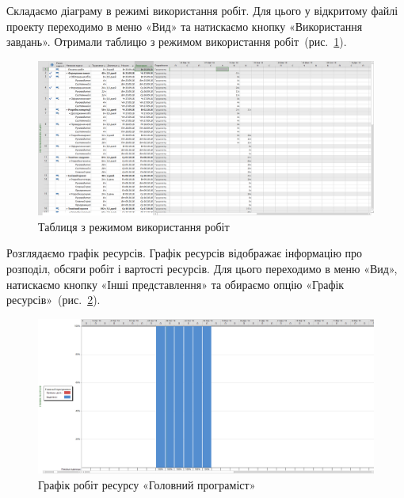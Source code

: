 \documentclass[
	a4paper,
	oneside,
	BCOR = 10mm,
	DIV = 12,
	12pt,
	headings = normal,
]{scrartcl}
\begin{document}
		Складаємо діаграму в режимі використання робіт. Для цього у відкритому файлі проекту переходимо в меню «Вид» та натискаємо кнопку «Використання завдань». Отримали таблицю з режимом використання робіт~(рис.~\ref{fig:02-table-work-usage}).
		\begin{figure}[!htbp]
			\centering
			\includegraphics[height = 12\baselineskip]{./assets/y03s01-softeng-lab-04-p02-v02.png}
			\caption{Таблиця з режимом використання робіт}
			\label{fig:02-table-work-usage}
		\end{figure}

		Розглядаємо графік ресурсів. Графік ресурсів відображає інформацію про розподіл, обсяги робіт і вартості ресурсів. Для цього переходимо в меню «Вид», натискаємо кнопку «Інші представлення» та обираємо опцію «Графік ресурсів»~(рис.~\ref{fig:03-resource-schedule}).
		\begin{figure}[!htbp]
			\centering
			\includegraphics[height = 10\baselineskip]{./assets/y03s01-softeng-lab-04-p03-v02.png}
			\caption{Графік робіт ресурсу «Головний програміст»}
			\label{fig:03-resource-schedule}
		\end{figure}
\end{document}
